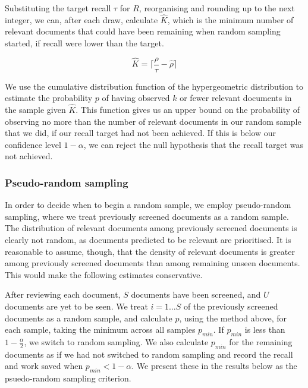 \documentclass{bmcart}
\begin{document}
	Substituting the target recall $\tau$ for $R$, reorganising and rounding up to the next integer, we can, after each draw, calculate $\hat{K}$, which is the minimum number of relevant documents that could have been remaining when random sampling started, if recall were lower than the target.
	
	\begin{equation}
		\hat{K} = \lceil \frac{\rho}{\tau} - \hat{\rho} \rceil
	\end{equation}
	
	We use the cumulative distribution function of the hypergeometric distribution to estimate the probability $p$ of having observed $k$ or fewer relevant documents in the sample given $\hat{K}$. This function gives us an upper bound on the probability of observing no more than the number of relevant documents in our random sample that we did, if our recall target had not been achieved.
	If this is below our confidence level $1 - \alpha$, we can reject the null hypothesis that the recall target was not achieved.
	
	
	


	\subsubsection*{Pseudo-random sampling}
	
	In order to decide when to begin a random sample, we employ pseudo-random sampling, where we treat previously screened documents as a random sample. The distribution of relevant documents among previously screened documents is clearly not random, as documents predicted to be relevant are prioritised. It is reasonable to assume, though, that the density of relevant documents is greater among previously screened documents than among remaining unseen documents. This would make the following estimates conservative. 
	
	After reviewing each document, $S$ documents have been screened, and $U$ documents are yet to be seen. We treat $i = 1 \dots S$ of the previously screened documents as a random sample, and calculate $p$, using the method above, for each sample, taking the minimum across all samples $p_{min}$. If $p_{min}$ is less than $1-\frac{\alpha}{2}$, we switch to random sampling. We also calculate $p_{min}$ for the remaining documents as if we had not switched to random sampling and record the recall and work saved when $p_{min} < 1 - \alpha$. We present these in the results below as the psuedo-random sampling criterion.
\end{document}
